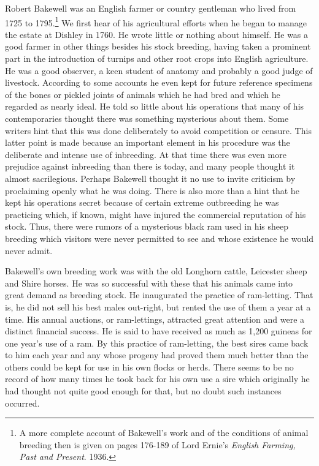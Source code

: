 Robert Bakewell was an English farmer or country gentleman who lived from 1725 to 1795.\footnote{A more complete account of 
Bakewell's work and of the conditions of animal breeding then is given on pages 176-189 of Lord Ernie's \textit{English 
Farming, Past and Present}. 1936.} We first hear of his agricultural efforts when he began to manage the estate at Dishley 
in 1760. He wrote little or nothing about himself. He was a good farmer in other things besides his stock breeding, having 
taken a prominent part in the introduction of turnips and other root crops into English agriculture. He was a good 
observer, a keen student of anatomy and probably a good judge of livestock. According to some accounts he even kept for 
future reference specimens of the bones or pickled joints of animals which he had bred and which he regarded as nearly 
ideal. He told so little about his operations that many of his contemporaries thought there was something mysterious about 
them. Some writers hint that this was done deliberately to avoid competition or censure. This latter point is made because 
an important element in his procedure was the deliberate and intense use of inbreeding. At that time there was even more 
prejudice against inbreeding than there is today, and many people thought it almost sacrilegious. Perhaps Bakewell thought 
it no use to invite criticism by proclaiming openly what he was doing. There is also more than a hint that he kept his 
operations secret because of certain extreme outbreeding he was practicing which, if known, might have injured the 
commercial reputation of his stock. Thus, there were rumors of a mysterious black ram used in his sheep breeding which 
visitors were never permitted to see and whose existence he would never admit.

Bakewell's own breeding work was with the old Longhorn cattle, Leicester sheep and Shire horses. He was so successful with 
these that his animals came into great demand as breeding stock. He inaugurated the practice of ram-letting. That is, he  
did not sell his best males out-right, but rented the use of them a year at a time. His annual auctions, or ram-lettings, 
attracted great attention and were a distinct financial success. He is said to have received as much as 1,200 guineas for 
one year's use of a ram. By this practice of ram-letting, the best sires came back to him each year and any whose progeny 
had proved them much better than the others could be kept for use in his own flocks or herds. There seems to be no record 
of how many times he took back for his own use a sire which originally he had thought not quite good enough for that, but 
no doubt such instances occurred. 

